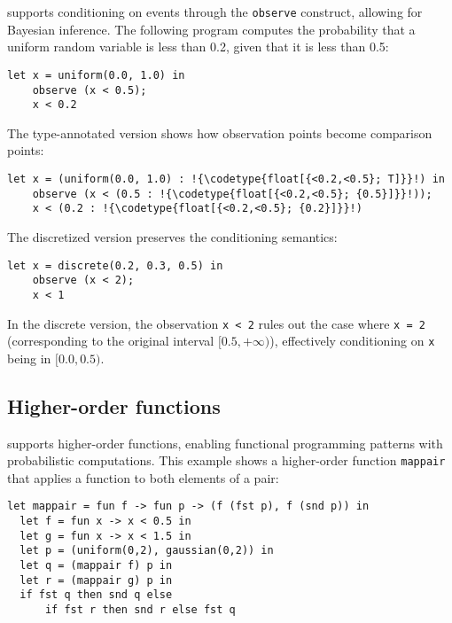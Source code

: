\documentclass[acmsmall,screen,dvipsnames,x11names,nonacm,anonymous,review]{acmart}
\newcommand{\codetype}[1]{\textcolor{typecolor}{\ttfamily\small#1}}
\begin{document}
\Slice{} supports conditioning on events through the \texttt{observe} construct, allowing for Bayesian inference. The following program computes the probability that a uniform random variable is less than 0.2, given that it is less than 0.5:

\begin{lstlisting}[aboveskip=1em,belowskip=1em,escapechar=!]
    let x = uniform(0.0, 1.0) in
    observe (x < 0.5);
    x < 0.2
\end{lstlisting}

\noindent The type-annotated version shows how observation points become comparison points:

\begin{lstlisting}[aboveskip=1em,belowskip=1em,escapechar=!]
    let x = (uniform(0.0, 1.0) : !{\codetype{float[{<0.2,<0.5}; T]}}!) in
    observe (x < (0.5 : !{\codetype{float[{<0.2,<0.5}; {0.5}]}}!));
    x < (0.2 : !{\codetype{float[{<0.2,<0.5}; {0.2}]}}!)
\end{lstlisting}

\noindent The discretized version preserves the conditioning semantics:

\begin{lstlisting}[aboveskip=1em,belowskip=1em]
    let x = discrete(0.2, 0.3, 0.5) in
    observe (x < 2);
    x < 1
\end{lstlisting}

\noindent In the discrete version, the observation \texttt{x < 2} rules out the case where \texttt{x = 2} (corresponding to the original interval $[0.5, +\infty)$), effectively conditioning on \texttt{x} being in $[0.0, 0.5)$.

\subsection{Higher-order functions}

\Slice{} supports higher-order functions, enabling functional programming patterns with probabilistic computations. This example shows a higher-order function \texttt{mappair} that applies a function to both elements of a pair:

\begin{lstlisting}[aboveskip=1em,belowskip=1em,escapechar=!]
  let mappair = fun f -> fun p -> (f (fst p), f (snd p)) in
  let f = fun x -> x < 0.5 in
  let g = fun x -> x < 1.5 in
  let p = (uniform(0,2), gaussian(0,2)) in
  let q = (mappair f) p in
  let r = (mappair g) p in
  if fst q then snd q else 
      if fst r then snd r else fst q
\end{lstlisting}
\end{document}
